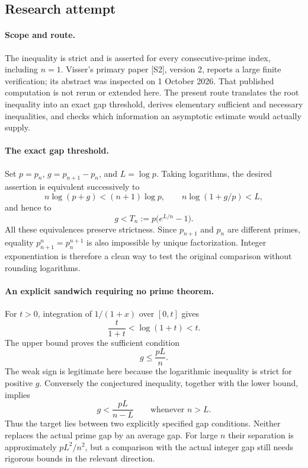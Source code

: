 \documentclass[11pt,a4paper]{article}
\begin{document}
\subsection{Research attempt}

\paragraph{Scope and route.}
The inequality is strict and is asserted for every consecutive-prime
index, including $n=1$. Visser's primary paper [S2], version 2, reports
a large finite verification; its abstract was inspected on 1 October
2026. That published computation is not rerun or extended here. The
present route translates the root inequality into an exact gap threshold,
derives elementary sufficient and necessary inequalities, and checks
which information an asymptotic estimate would actually supply.

\paragraph{The exact gap threshold.}
Set $p=p_n$, $g=p_{n+1}-p_n$, and $L=\log p$. Taking logarithms,
the desired assertion is equivalent successively to
\[
 n\log(p+g)<(n+1)\log p,
 \qquad n\log(1+g/p)<L,
\]
and hence to
\[
 g<T_n:=p\bigl(e^{L/n}-1\bigr).
\]
All these equivalences preserve strictness. Since $p_{n+1}$ and $p_n$
are different primes, equality $p_{n+1}^n=p_n^{n+1}$ is also impossible
by unique factorization. Integer exponentiation is therefore a clean
way to test the original comparison without rounding logarithms.

\paragraph{An explicit sandwich requiring no prime theorem.}
For $t>0$, integration of $1/(1+x)$ over $[0,t]$ gives
\[
 \frac{t}{1+t}<\log(1+t)<t.
\]
The upper bound proves the sufficient condition
\[
                     g\le\frac{pL}{n}.
\]
The weak sign is legitimate here because the logarithmic inequality
is strict for positive $g$. Conversely the conjectured inequality,
together with the lower bound, implies
\[
 g<\frac{pL}{n-L}\qquad\text{whenever }n>L.
\]
Thus the target lies between two explicitly specified gap conditions.
Neither replaces the actual prime gap by an average gap. For large
$n$ their separation is approximately $pL^2/n^2$, but a comparison
with the actual integer gap still needs rigorous bounds in the relevant
direction.
\end{document}
